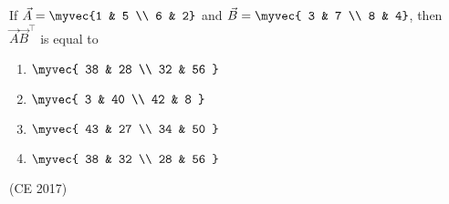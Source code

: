     \item If $ \vec{A} = \myvec{1 & 5 \\ 6 & 2} $ and $ \vec{B} = \myvec{ 3 & 7 \\ 8 & 4} $, then $ \vec{A}\vec{B}^{\top} $ is equal to
    \begin{multicols}{4}
    \begin{enumerate}
        \item $\myvec{ 38 & 28 \\ 32 & 56 }$  
        \item $\myvec{ 3 & 40 \\ 42 & 8 }$  
        \item $\myvec{ 43 & 27 \\ 34 & 50 }$  
        \item $\myvec{ 38 & 32 \\ 28 & 56 }$  
    \end{enumerate}
    \end{multicols}
   \hfill (CE 2017)
